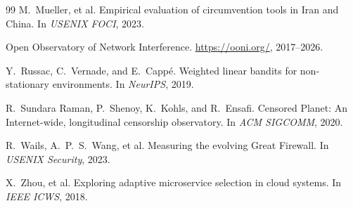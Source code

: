 \documentclass[11pt,a4paper]{article}
\begin{document}
\begin{thebibliography}{99}
M.~Mueller, et al.
Empirical evaluation of circumvention tools in Iran and China.
In \textit{USENIX FOCI}, 2023.

Open Observatory of Network Interference.
\url{https://ooni.org/}, 2017--2026.

Y.~Russac, C.~Vernade, and E.~Cappé.
Weighted linear bandits for non-stationary environments.
In \textit{NeurIPS}, 2019.

R.~Sundara Raman, P.~Shenoy, K.~Kohls, and R.~Ensafi.
Censored Planet: An Internet-wide, longitudinal censorship
observatory. In \textit{ACM SIGCOMM}, 2020.

R.~Wails, A.~P.~S.~Wang, et al.
Measuring the evolving Great Firewall.
In \textit{USENIX Security}, 2023.

X.~Zhou, et al.
Exploring adaptive microservice selection in cloud systems.
In \textit{IEEE ICWS}, 2018.

\end{thebibliography}
\end{document}
